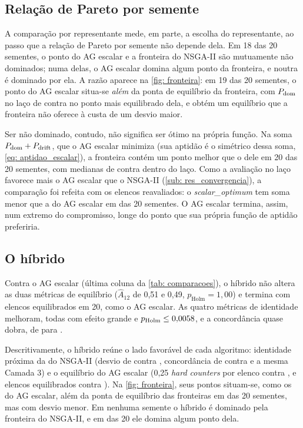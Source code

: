 \subsection{Relação de Pareto por semente}
\label{sub: res_pareto}

A comparação por representante mede, em parte, a escolha do representante, ao passo que a relação de Pareto por semente não depende dela. Em 18 das 20 sementes, o ponto do AG escalar e a fronteira do NSGA-II são mutuamente não dominados; numa delas, o AG escalar domina algum ponto da fronteira, e noutra é dominado por ela. A razão aparece na \autoref{fig: fronteira}: em 19 das 20 sementes, o ponto do AG escalar situa-se \textit{além} da ponta de equilíbrio da fronteira, com $P_{\mathrm{dom}}$ no laço de \domLacoAG{} contra \domLacoFronteiraMin{} no ponto mais equilibrado dela, e obtém um equilíbrio que a fronteira não oferece à custa de um desvio maior.

Ser não dominado, contudo, não significa ser ótimo na própria função. Na soma $P_{\mathrm{dom}} + P_{\mathrm{drift}}$, que o AG escalar minimiza (sua aptidão é o simétrico dessa soma, \autoref{eq: aptidao_escalar}), a fronteira contém um ponto melhor que o dele em 20 das 20 sementes, com medianas de \somaFronteira{} contra \somaAG{} dentro do laço. Como a avaliação no laço favorece mais o AG escalar que o NSGA-II (\autoref{sub: res_convergencia}), a comparação foi refeita com os elencos reavaliados: o \textit{scalar\_optimum} tem soma menor que a do AG escalar em \somaReavSOmelhorAG{} das 20 sementes. O AG escalar termina, assim, num extremo do compromisso, longe do ponto que sua própria função de aptidão preferiria.

\subsection{O híbrido}
\label{sub: res_hibrido}

Contra o AG escalar (última coluna da \autoref{tab: comparacoes}), o híbrido não altera as duas métricas de equilíbrio ($\hat{A}_{12}$ de 0,51 e 0,49, $p_{\mathrm{Holm}} = 1{,}00$) e termina com \equilHib{} elencos equilibrados em 20, como o AG escalar. As quatro métricas de identidade melhoram, todas com efeito grande e $p_{\mathrm{Holm}} \le 0{,}0058{}$, e a concordância quase dobra, de \tauAG{} para \tauHib{}.

Descritivamente, o híbrido reúne o lado favorável de cada algoritmo: identidade próxima da do NSGA-II (desvio de \driftHib{} contra \driftNSGA{}, concordância de \tauHib{} contra \tauNSGA{} e a mesma Camada 3) e o equilíbrio do AG escalar (0,25 \textit{hard counters} por elenco contra \hcNSGAmedia{}, e \equilHib{} elencos equilibrados contra \equilNSGA{}). Na \autoref{fig: fronteira}, seus pontos situam-se, como os do AG escalar, além da ponta de equilíbrio das fronteiras em \hibAlemPonta{} das 20 sementes, mas com desvio menor. Em nenhuma semente o híbrido é dominado pela fronteira do NSGA-II, e em \hibDominaFronteira{} das 20 ele domina algum ponto dela.

